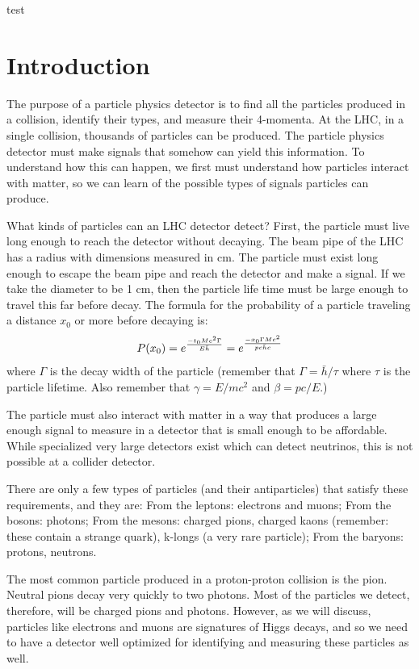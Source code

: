 test

\section{Introduction}

The purpose of a particle physics detector is to find all the particles produced
in a collision, identify their types, and measure their 4-momenta.
At the LHC, in a single collision, thousands of particles can be produced.
The particle physics detector must make signals that somehow can yield this information.
To understand how this can happen, we first must understand how particles interact
with matter, so we can learn of the possible types of signals particles can produce.

What kinds of particles can an LHC detector detect?  First, the particle must live long 
enough to reach the detector without decaying.  The beam pipe of the LHC has a 
radius with dimensions measured in cm.  The particle must exist long enough to escape the beam pipe and
reach the detector and make a signal.  If we take the diameter to be 1 cm, then
the particle life time must be large enough to travel this far before decay.
The formula for the probability of a particle traveling a distance $x_0$ or more before decaying is:
\begin{equation}
P(x_0)=e^{-{t_0 Mc^2 \Gamma} \over {E \bar{h}}}=e^{{-x_0\Gamma Mc^2}\over{pc\bar{h}c}}
\end{equation}
where $\Gamma$ is the decay width of the particle (remember that $\Gamma=\bar{h}/\tau$ where $\tau$ is the particle lifetime. Also remember that $\gamma=E/mc^2$ and $\beta=pc/E$.)

The particle must also interact  with matter in a way that produces a large enough signal to measure in a detector that is small enough to be affordable.  While specialized very large detectors exist which can detect neutrinos, this is not possible at a collider detector.

There are only a few types of particles (and their antiparticles) that satisfy these requirements, and they are:  From the leptons: electrons and muons; From the bosons: photons; From the mesons:
charged pions, charged kaons (remember: these contain a strange quark), k-longs (a very rare particle); From the baryons: protons, neutrons.

The most common particle produced in a proton-proton collision is the pion.  Neutral pions decay very quickly to two photons. Most of the particles we detect, therefore, will be charged pions and photons.  However, as we will discuss, particles like electrons and muons are signatures of Higgs decays, and so we need to have a detector well optimized for identifying and measuring these particles as well.




